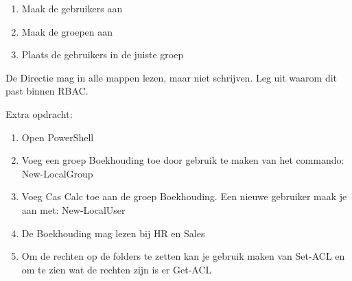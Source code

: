 \begin{enumerate}
\item Maak de gebruikers aan
\item Maak de groepen aan
\item Plaats de gebruikers in de juiste groep
\end{enumerate}

De Directie mag in alle mappen lezen, maar niet schrijven. Leg uit waarom dit past binnen RBAC.

Extra opdracht:
\begin{enumerate}
\item Open PowerShell
\item Voeg een groep Boekhouding toe door gebruik te maken van het commando: New-LocalGroup
\item Voeg Cas Calc toe aan de groep Boekhouding. Een nieuwe gebruiker maak je aan met: New-LocalUser
\item De Boekhouding mag lezen bij HR en Sales
\item Om de rechten op de folders te zetten kan je gebruik maken van Set-ACL en om te zien wat de rechten zijn is er Get-ACL
\end{enumerate}

